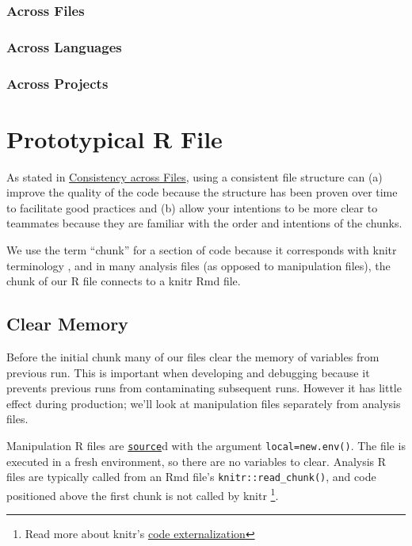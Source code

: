 \documentclass[
]{book}
\begin{document}
\hypertarget{consistency-files}{%
\subsection{Across Files}\label{consistency-files}}

\hypertarget{across-languages}{%
\subsection{Across Languages}\label{across-languages}}

\hypertarget{across-projects}{%
\subsection{Across Projects}\label{across-projects}}

\hypertarget{file-prototype-r}{%
\chapter{Prototypical R File}\label{file-prototype-r}}

As stated in \protect\hyperlink{consistency-files}{Consistency across Files}, using a consistent file structure can (a) improve the quality of the code because the structure has been proven over time to facilitate good practices and (b) allow your intentions to be more clear to teammates because they are familiar with the order and intentions of the chunks.

We use the term ``chunk'' for a section of code because it corresponds with knitr terminology \citep{xie2015}, and in many analysis files (as opposed to manipulation files), the chunk of our R file connects to a knitr Rmd file.

\hypertarget{chunk-clear}{%
\section{Clear Memory}\label{chunk-clear}}

Before the initial chunk many of our files clear the memory of variables from previous run. This is important when developing and debugging because it prevents previous runs from contaminating subsequent runs. However it has little effect during production; we'll look at manipulation files separately from analysis files.

Manipulation R files are \href{https://stat.ethz.ch/R-manual/R-devel/library/base/html/source.html}{\texttt{source}}d with the argument \texttt{local=new.env()}. The file is executed in a fresh environment, so there are no variables to clear. Analysis R files are typically called from an Rmd file's \texttt{knitr::read\_chunk()}, and code positioned above the first chunk is not called by knitr \footnote{Read more about knitr's \href{https://yihui.name/knitr/demo/externalization/}{code externalization}}.
\end{document}
